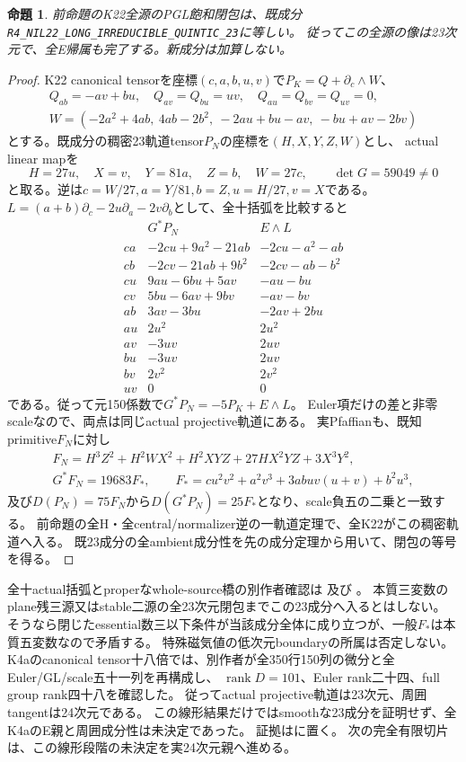 \documentclass[a4paper,11pt]{ltjsarticle}
\newtheorem{proposition}{命題}[section]
\theoremstyle{definition}
\newcommand{\rank}{\operatorname{rank}}
\begin{document}
\begin{proposition}\label{prop:plane-concurrent-m3-K22-known-E}
前命題のK22全源のPGL飽和閉包は、既成分
\nolinkurl{R4_NIL22_LONG_IRREDUCIBLE_QUINTIC_23}に等しい。
従ってこの全源の像は23次元で、全E帰属も完了する。新成分は加算しない。
\end{proposition}
\begin{proof}
K22 canonical tensorを座標$(c,a,b,u,v)$で$P_K=Q+\partial_c\wedge W$、
\[
\begin{gathered}
 Q_{ab}=-av+bu,\quad Q_{av}=Q_{bu}=uv,\quad Q_{au}=Q_{bv}=Q_{uv}=0,\\
 W=(-2a^2+4ab,\ 4ab-2b^2,\ -2au+bu-av,\ -bu+av-2bv)
\end{gathered}
\]
とする。既成分の稠密23軌道tensor$P_N$の座標を$(H,X,Y,Z,W)$とし、
actual linear mapを
\[
 H=27u,\quad X=v,\quad Y=81a,\quad Z=b,\quad W=27c,
 \qquad\det G=59049\ne0
\]
と取る。逆は$c=W/27,a=Y/81,b=Z,u=H/27,v=X$である。
$L=(a+b)\partial_c-2u\partial_a-2v\partial_b$として、全十括弧を比較すると
\[
\begin{array}{c|c|c}
 &G^*P_N&E\wedge L\\\hline
 ca&-2cu+9a^2-21ab&-2cu-a^2-ab\\
 cb&-2cv-21ab+9b^2&-2cv-ab-b^2\\
 cu&9au-6bu+5av&-au-bu\\
 cv&5bu-6av+9bv&-av-bv\\
 ab&3av-3bu&-2av+2bu\\
 au&2u^2&2u^2\\
 av&-3uv&2uv\\
 bu&-3uv&2uv\\
 bv&2v^2&2v^2\\
 uv&0&0
\end{array}
\]
である。従って元150係数で$G^*P_N=-5P_K+E\wedge L$。
Euler項だけの差と非零scaleなので、両点は同じactual projective軌道にある。
実Pfaffianも、既知primitive$F_N$に対し
\[
\begin{gathered}
 F_N=H^3Z^2+H^2WX^2+H^2XYZ+27HX^2YZ+3X^3Y^2,\\
 G^*F_N=19683F_*,\qquad
 F_*=cu^2v^2+a^2v^3+3abuv(u+v)+b^2u^3,
\end{gathered}
\]
及び$D(P_N)=75F_N$から$D(G^*P_N)=25F_*$となり、scale負五の二乗と一致する。
前命題の全H・全central/normalizer逆の一軌道定理で、全K22がこの稠密軌道へ入る。
既23成分の全ambient成分性を先の成分定理から用いて、閉包の等号を得る。
\end{proof}
全十actual括弧とproperなwhole-source橋の別作者確認は
及び
。
本質三変数のplane残三源又はstable二源の全23次元閉包までこの23成分へ入るとはしない。
そうなら閉じたessential数三以下条件が当該成分全体に成り立つが、一般$F_*$は本質五変数なので矛盾する。
特殊磁気値の低次元boundaryの所属は否定しない。
K4aのcanonical tensor十八倍では、別作者が全350行150列の微分と全Euler/GL/scale五十一列を再構成し、
$\rank D=101$、Euler rank二十四、full group rank四十八を確認した。
従ってactual projective軌道は23次元、周囲tangentは24次元である。
この線形結果だけではsmoothな23成分を証明せず、全K4aのE親と周囲成分性は未決定であった。
証拠はに置く。
次の完全有限切片は、この線形段階の未決定を実24次元親へ進める。
\end{document}

